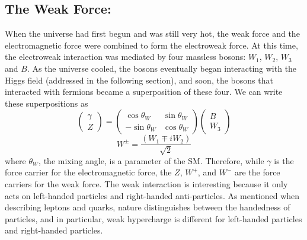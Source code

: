 \subsection{The Weak Force:}
When the universe had first begun and was still very hot, the weak force and the electromagnetic force were combined to form the electroweak force. At this time, the electroweak interaction was mediated by four massless bosons: $W_1$, $W_2$, $W_3$ and $B$. As the universe cooled, the bosons eventually began interacting with the Higgs field (addressed in the following section), and soon, the bosons that interacted with fermions became a superposition of these four. 
We can write these superpositions as
\begin{equation}
    \left( \begin{array}{c} \gamma \\ Z \end{array} \right) = \left( \begin{array}{c} \cos\theta_W \\ -\sin\theta_W \end{array} \begin{array}{c} \sin\theta_W \\ \cos\theta_W \end{array} \right) \left( \begin{array}{c} B \\ W_3 \end{array} \right)
\label{eqn:WZ1}
\end{equation}
    \begin{equation}
    W^\pm = \frac{(W_1\mp iW_2)}{\sqrt{2}}
\label{eqn:WZ2}
\end{equation}
where $\theta_W$, the mixing angle, is a parameter of the SM. Therefore, while $\gamma$ is the force carrier for the electromagnetic force, the $Z$, $W^{+}$, and $W^{-}$ are the force carriers for the weak force. The weak interaction is interesting because it only acts on left-handed particles and right-handed anti-particles. As mentioned when describing leptons and quarks, nature distinguishes between the handedness of particles, and in particular, weak hypercharge is different for left-handed particles and right-handed particles.

